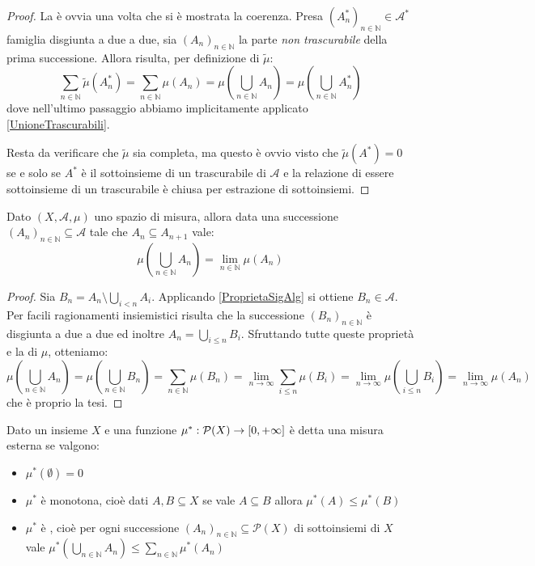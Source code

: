 \begin{proof}
	La \sigadd[ità] è ovvia una volta che si è mostrata la coerenza. Presa $(A^*_n)_{n\in\mathbb N}\in\mathcal A^*$ famiglia disgiunta a due a due, sia $(A_n)_{n\in\mathbb N}$ la parte \emph{non trascurabile} della prima successione. Allora risulta, per definizione di $\tilde\mu$:
	\begin{equation*}
		\sum_{n\in\mathbb N} \tilde\mu(A^*_n)=\sum_{n\in\mathbb N} \mu(A_n)=\mu\left(\bigcup_{n\in\mathbb N} A_n\right)=\mu\left(\bigcup_{n\in\mathbb N} A^*_n\right)
	\end{equation*}
	dove nell'ultimo passaggio abbiamo implicitamente applicato \cref{UnioneTrascurabili}.
	
	Resta da verificare che $\tilde\mu$ sia completa, ma questo è ovvio visto che  $\tilde\mu(A^*)=0$ se e solo se $A^*$ è il sottoinsieme di un trascurabile di $\mathcal A$ e la relazione di essere sottoinsieme di un trascurabile è chiusa per estrazione di sottoinsiemi. 

\end{proof}



\begin{proposition}\label{LimiteMonotonoMisura}
	Dato $(X,\mathcal A,\mu)$ uno spazio di misura, allora data una successione $(A_n)_{n\in\mathbb N}\subseteq \mathcal A$ tale che $A_n\subseteq A_{n+1}$ vale:
	\begin{equation*}
		\mu\left(\bigcup_{n\in\mathbb N} A_n\right)=\lim_{n\in\mathbb N} \mu(A_n)
	\end{equation*}
\end{proposition}
\begin{proof}
	Sia $B_n=A_n\setminus\bigcup_{i<n}A_i$. Applicando \cref{ProprietaSigAlg} si ottiene $B_n\in\mathcal A$.
	Per facili ragionamenti insiemistici risulta che la successione $(B_n)_{n\in\mathbb N}$ è disgiunta a due a due ed inoltre $A_n=\bigcup_{i\le n}B_i$.
	Sfruttando tutte queste proprietà e la \sigadd[ità] di $\mu$, otteniamo:
	\begin{equation*}
		\mu\left(\bigcup_{n\in\mathbb N} A_n\right)=\mu\left(\bigcup_{n\in\mathbb N} B_n\right)=
		\sum_{n\in\mathbb N} \mu(B_n)=\lim_{n\to\infty} \sum_{i\le n} \mu(B_i)=
		\lim_{n\to\infty} \mu\left(\bigcup_{i\le n} B_i\right)=\lim_{n\to\infty} \mu(A_n)
	\end{equation*}
	che è proprio la tesi.
\end{proof}

\begin{definition}
	Dato un insieme $X$ e una funzione $\mu^*:\mathcal P(X)\to [0,+\infty]$ è detta una misura esterna se valgono:
	\begin{itemize}
		\item $\mu^*(\emptyset)=0$
		\item $\mu^*$ è monotona, cioè dati $A,B\subseteq X$ se vale $A\subseteq B$ allora $\mu^*(A)\le \mu^*(B)$
		\item $\mu^*$ è \sigsubadd{}, cioè  per ogni successione $(A_n)_{n\in\mathbb N}\subseteq \mathcal P(X)$ di sottoinsiemi di $X$ vale $\mu^*\left(\bigcup_{n\in\mathbb{N}}A_n\right)\le \sum_{n\in\mathbb N} \mu^*(A_n)$
	\end{itemize}
\end{definition}

